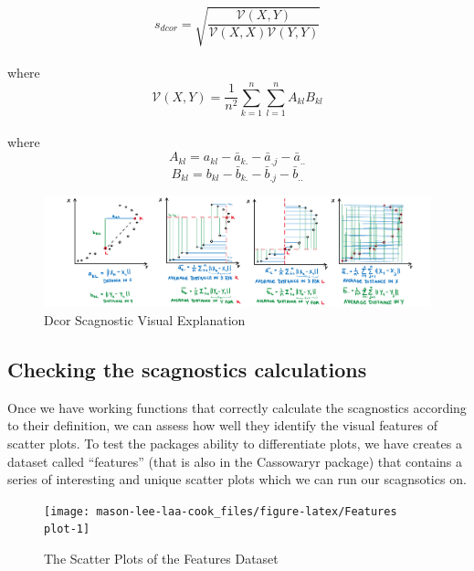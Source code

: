 \[s_{dcor}= \sqrt{\frac{\mathcal{V}(X,Y)}{\mathcal{V}(X,X)\mathcal{V}(Y,Y)}}\]\\
where \[\mathcal{V}
(X,Y)=\frac{1}{n^2}\sum_{k=1}^n\sum_{l=1}^nA_{kl}B_{kl}\]\\
where \[A_{kl}=a_{kl}-\bar{a}_{k.}-\bar{a}_{.j}-\bar{a}_{..}\]
\[B_{kl}=b_{kl}-\bar{b}_{k.}-\bar{b}_{.j}-\bar{b}_{..}\]

\begin{Schunk}
\begin{figure}
\includegraphics[width=1\linewidth,height=0.2\textheight]{figures/drawdcor} \caption[Dcor Scagnostic Visual Explanation]{Dcor Scagnostic Visual Explanation}\label{fig:dcorscag}
\end{figure}
\end{Schunk}

\hypertarget{checking-the-scagnostics-calculations}{%
\subsection{Checking the scagnostics
calculations}\label{checking-the-scagnostics-calculations}}

Once we have working functions that correctly calculate the scagnostics
according to their definition, we can assess how well they identify the
visual features of scatter plots. To test the packages ability to
differentiate plots, we have creates a dataset called ``features'' (that
is also in the Cassowaryr package) that contains a series of interesting
and unique scatter plots which we can run our scagnsotics on.

\begin{Schunk}
\begin{figure}
\texttt{[image: mason-lee-laa-cook\_files/figure-latex/Features plot-1]} \caption[The Scatter Plots of the Features Dataset]{The Scatter Plots of the Features Dataset}\label{fig:Features plot}
\end{figure}
\end{Schunk}

